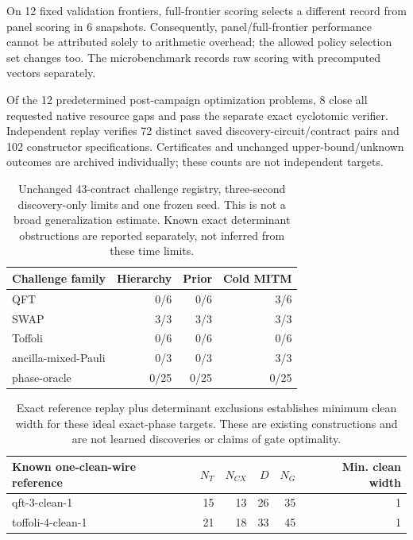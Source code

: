 On 12 fixed validation frontiers, full-frontier scoring selects a different record from panel scoring in 6 snapshots. Consequently, panel/full-frontier performance cannot be attributed solely to arithmetic overhead; the allowed policy selection set changes too. The microbenchmark records raw scoring with precomputed vectors separately.

Of the 12 predetermined post-campaign optimization problems, 8 close all requested native resource gaps and pass the separate exact cyclotomic verifier. Independent replay verifies 72 distinct saved discovery-circuit/contract pairs and 102 constructor specifications. Certificates and unchanged upper-bound/unknown outcomes are archived individually; these counts are not independent targets.

\begin{table}[htbp]\centering\small\begin{tabular}{lrrr}\toprule

Challenge family & Hierarchy & Prior & Cold MITM \\ \midrule

QFT & 0/6 & 0/6 & 3/6 \\

SWAP & 3/3 & 3/3 & 3/3 \\

Toffoli & 0/6 & 0/6 & 0/6 \\

ancilla-mixed-Pauli & 0/3 & 0/3 & 3/3 \\

phase-oracle & 0/25 & 0/25 & 0/25 \\

\bottomrule\end{tabular}\caption{Unchanged 43-contract challenge registry, three-second discovery-only limits and one frozen seed. This is not a broad generalization estimate. Known exact determinant obstructions are reported separately, not inferred from these time limits.}\label{tab:challenges}\end{table}

\begin{table}[htbp]\centering\small\begin{tabular}{lrrrrr}\toprule

Known one-clean-wire reference & $N_T$ & $N_{CX}$ & $D$ & $N_G$ & Min. clean width \\ \midrule

qft-3-clean-1 & 15 & 13 & 26 & 35 & 1 \\

toffoli-4-clean-1 & 21 & 18 & 33 & 45 & 1 \\

\bottomrule\end{tabular}\caption{Exact reference replay plus determinant exclusions establishes minimum clean width for these ideal exact-phase targets. These are existing constructions and are not learned discoveries or claims of gate optimality.}\label{tab:reach}\end{table}

